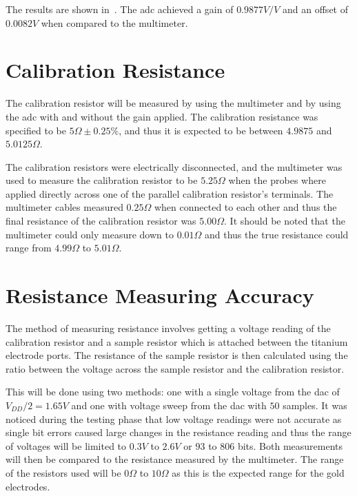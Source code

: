 The results are shown in~. 
The \gls{adc} achieved a gain of $0.9877V/V$ and an offset of $0.0082V$ when compared to the multimeter.

\section{Calibration Resistance}\label{sec:calibration-resistance}

The calibration resistor will be measured by using the multimeter and by using the \gls{adc} with and without the gain applied.
The calibration resistance was specified to be $5\Omega \pm 0.25\%$, and thus it is expected to be between $4.9875$ and $5.0125\Omega$.

The calibration resistors were electrically disconnected, and the multimeter was used to measure the calibration resistor to be $5.25\Omega$ when the probes where applied directly across one of the parallel calibration resistor's terminals.
The multimeter cables measured $0.25\Omega$ when connected to each other and thus the final resistance of the calibration resistor was $5.00\Omega$.
It should be noted that the multimeter could only measure down to $0.01\Omega$ and thus the true resistance could range from $4.99\Omega$ to $5.01\Omega$.


\section{Resistance Measuring Accuracy}\label{sec:resistance-measuring-accuracy}

The method of measuring resistance involves getting a voltage reading of the calibration resistor and a sample resistor which is attached between the titanium electrode ports.
The resistance of the sample resistor is then calculated using the ratio between the voltage across the sample resistor and the calibration resistor.

This will be done using two methods: one with a single voltage from the \gls{dac} of $V_{DD}/2 = 1.65V$ and one with voltage sweep from the \gls{dac} with $50$ samples.
It was noticed during the testing phase that low voltage readings were not accurate as single bit errors caused large changes in the resistance reading and thus the range of voltages will be limited to $0.3V$ to $2.6V$ or $93$ to $806$ bits.
Both measurements will then be compared to the resistance measured by the multimeter.
The range of the resistors used will be $0\Omega$ to $10\Omega$ as this is the expected range for the gold electrodes.

